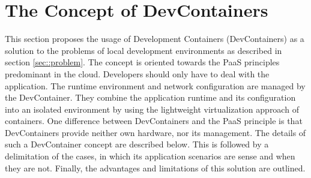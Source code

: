

\section{The Concept of DevContainers}\label{sec::solution_concept}
This section proposes the usage of Development Containers (DevContainers) as a solution to the problems of local development environments as described in section \ref{sec::problem}. The concept is oriented towards the \ac{PaaS} principles predominant in the cloud. Developers should only have to deal with the application. The runtime environment and network configuration are managed by the DevContainer. They combine the application runtime and its configuration into an isolated environment by using the lightweight virtualization approach of containers. One difference between DevContainers and the \ac{PaaS} principle is that DevContainers provide neither own hardware, nor its management.\newline
The details of such a DevContainer concept are described below. This is followed by a delimitation of the cases, in which its application scenarios are sense and when they are not. Finally, the advantages and limitations of this solution are outlined.

